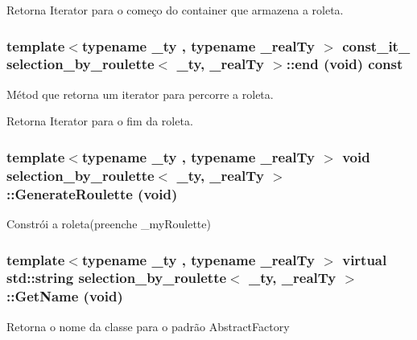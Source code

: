 \begin{DoxyReturn}{Retorna}
Iterator para o começo do container que armazena a roleta. 
\end{DoxyReturn}
\hypertarget{classselection__by__roulette_a2abe33c34280ba81f0f0dab12c8e875b}{
\subsubsection[{end}]{\setlength{\rightskip}{0pt plus 5cm}template$<$typename \_\-ty , typename \_\-realTy $>$ {\bf const\_\-it\_\-} {\bf selection\_\-by\_\-roulette}$<$ \_\-ty, \_\-realTy $>$::end (void) const}}
\label{classselection__by__roulette_a2abe33c34280ba81f0f0dab12c8e875b}
Métod que retorna um iterator para percorre a roleta.

\begin{DoxyReturn}{Retorna}
Iterator para o fim da roleta. 
\end{DoxyReturn}
\hypertarget{classselection__by__roulette_ac3db5bbe67ee2aa4e1942fd983d3cc80}{
\subsubsection[{GenerateRoulette}]{\setlength{\rightskip}{0pt plus 5cm}template$<$typename \_\-ty , typename \_\-realTy $>$ void {\bf selection\_\-by\_\-roulette}$<$ \_\-ty, \_\-realTy $>$::GenerateRoulette (void)}}
\label{classselection__by__roulette_ac3db5bbe67ee2aa4e1942fd983d3cc80}
Constrói a roleta(preenche \_\-myRoulette) \hypertarget{classselection__by__roulette_a137f1a757ab4d71a0ca0bdba7f9f35d0}{
\subsubsection[{GetName}]{\setlength{\rightskip}{0pt plus 5cm}template$<$typename \_\-ty , typename \_\-realTy $>$ virtual std::string {\bf selection\_\-by\_\-roulette}$<$ \_\-ty, \_\-realTy $>$::GetName (void)}}
\label{classselection__by__roulette_a137f1a757ab4d71a0ca0bdba7f9f35d0}
Retorna o nome da classe para o padrão AbstractFactory

